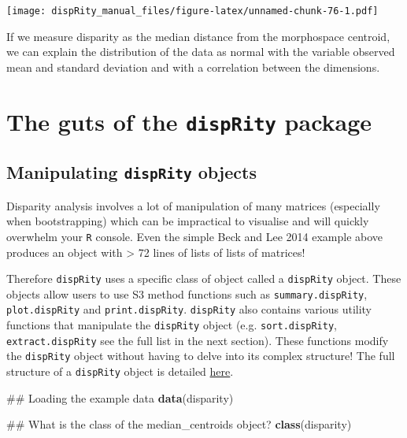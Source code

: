 \documentclass[]{book}
\newenvironment{Shaded}{\begin{snugshade}}{\end{snugshade}}
\newcommand{\KeywordTok}[1]{\textcolor[rgb]{0.13,0.29,0.53}{\textbf{#1}}}
\newcommand{\NormalTok}[1]{#1}
\theoremstyle{definition}
\theoremstyle{definition}
\theoremstyle{remark}
\begin{document}
\texttt{[image: dispRity\_manual\_files/figure-latex/unnamed-chunk-76-1.pdf]}

If we measure disparity as the median distance from the morphospace
centroid, we can explain the distribution of the data as normal with the
variable observed mean and standard deviation and with a correlation
between the dimensions.

\chapter{\texorpdfstring{The guts of the \texttt{dispRity}
package}{The guts of the dispRity package}}\label{the-guts-of-the-disprity-package}

\section{\texorpdfstring{Manipulating \texttt{dispRity}
objects}{Manipulating dispRity objects}}\label{manipulating-disprity-objects}

Disparity analysis involves a lot of manipulation of many matrices
(especially when bootstrapping) which can be impractical to visualise
and will quickly overwhelm your \texttt{R} console. Even the simple Beck
and Lee 2014 example above produces an object with \textgreater{} 72
lines of lists of lists of matrices!

Therefore \texttt{dispRity} uses a specific class of object called a
\texttt{dispRity} object. These objects allow users to use S3 method
functions such as \texttt{summary.dispRity}, \texttt{plot.dispRity} and
\texttt{print.dispRity}. \texttt{dispRity} also contains various utility
functions that manipulate the \texttt{dispRity} object (e.g.
\texttt{sort.dispRity}, \texttt{extract.dispRity} see the full list in
the next section). These functions modify the \texttt{dispRity} object
without having to delve into its complex structure! The full structure
of a \texttt{dispRity} object is detailed
\href{https://github.com/TGuillerme/dispRity/blob/master/disparity_object.md}{here}.

\begin{Shaded}
\begin{Highlighting}[]
\NormalTok{## Loading the example data}
\KeywordTok{data}\NormalTok{(disparity)}

\NormalTok{## What is the class of the median_centroids object?}
\KeywordTok{class}\NormalTok{(disparity)}
\end{Highlighting}
\end{Shaded}
\end{document}
